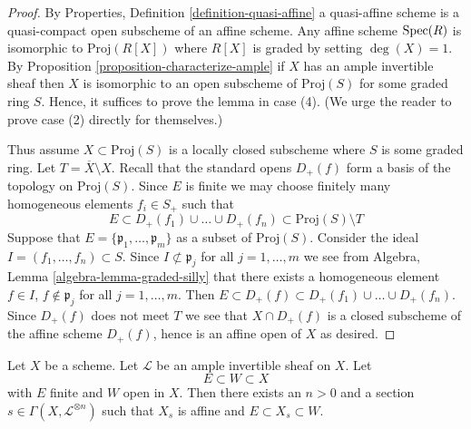 \begin{proof}
By Properties, Definition \ref{definition-quasi-affine}
a quasi-affine scheme is a quasi-compact open subscheme
of an affine scheme. Any affine scheme $\mathop{\mathrm{Spec}}(R)$ is isomorphic to
$\text{Proj}(R[X])$ where $R[X]$ is graded by setting $\deg(X) = 1$.
By Proposition \ref{proposition-characterize-ample}
if $X$ has an ample invertible sheaf then $X$ is isomorphic to an open
subscheme of $\text{Proj}(S)$ for some graded ring $S$.
Hence, it suffices to prove the lemma in case (4).
(We urge the reader to prove case (2) directly for themselves.)

\medskip\noindent
Thus assume $X \subset \text{Proj}(S)$ is a locally closed subscheme
where $S$ is some graded ring. Let $T = \overline{X} \setminus X$.
Recall that the standard opens $D_{+}(f)$ form a basis of the
topology on $\text{Proj}(S)$. Since $E$ is finite we may choose finitely many
homogeneous elements $f_i \in S_{+}$ such that
$$
E \subset
D_{+}(f_1) \cup \ldots \cup D_{+}(f_n) \subset
\text{Proj}(S) \setminus T
$$
Suppose that $E = \{\mathfrak p_1, \ldots, \mathfrak p_m\}$
as a subset of $\text{Proj}(S)$.
Consider the ideal $I = (f_1, \ldots, f_n) \subset S$.
Since $I \not \subset \mathfrak p_j$ for all $j = 1, \ldots, m$
we see from Algebra, Lemma \ref{algebra-lemma-graded-silly} that
there exists a homogeneous element $f \in I$, $f \not \in \mathfrak p_j$
for all $j = 1, \ldots, m$. Then $E \subset D_{+}(f) \subset
D_{+}(f_1) \cup \ldots \cup D_{+}(f_n)$. Since $D_{+}(f)$ does not
meet $T$ we see that $X \cap D_{+}(f)$ is a closed subscheme of the
affine scheme $D_{+}(f)$, hence is an affine open of $X$ as desired.
\end{proof}

\begin{lemma}
\label{lemma-ample-finite-set-in-principal-affine}
Let $X$ be a scheme. Let $\mathcal{L}$ be an ample invertible sheaf on $X$.
Let
$$
E \subset W \subset X
$$
with $E$ finite and $W$ open in $X$. Then there exists an $n > 0$
and a section $s \in \Gamma(X, \mathcal{L}^{\otimes n})$ such that
$X_s$ is affine and $E \subset X_s \subset W$.
\end{lemma}

